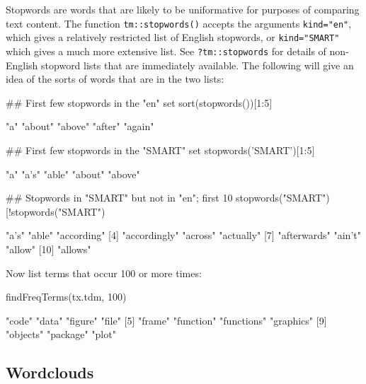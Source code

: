 \documentclass{tufte-book}\usepackage[]{graphicx}\usepackage[]{color}
\newcommand{\txtt}[1]{\texttt{#1}}
\begin{document}
Stopwords are words that are likely to be uniformative for purposes
of comparing text content.  The function \txtt{tm::stopwords()} 
accepts the arguments \txtt{kind="en"}, which gives a relatively
restricted list of English stopwords, or \txtt{kind="SMART"} which
gives a much more extensive list.  See \txtt{?tm::stopwords} for
details of non-English stopword lists that are immediately available.
The following will give an idea of the sorts of words that are in
the two lists:
\begin{Schunk}
\begin{Sinput}
## First few stopwords in the "en" set
sort(stopwords())[1:5]
\end{Sinput}
\begin{Soutput}
[1] "a"     "about" "above" "after" "again"
\end{Soutput}
\begin{Sinput}
## First few stopwords in the "SMART" set 
stopwords('SMART')[1:5]
\end{Sinput}
\begin{Soutput}
[1] "a"     "a's"   "able"  "about" "above"
\end{Soutput}
\begin{Sinput}
## Stopwords in "SMART" but not in "en"; first 10
stopwords("SMART")[!stopwords("SMART")%
\end{Sinput}
\begin{Soutput}
 [1] "a's"         "able"        "according"  
 [4] "accordingly" "across"      "actually"   
 [7] "afterwards"  "ain't"       "allow"      
[10] "allows"     
\end{Soutput}
\end{Schunk}

Now list terms that occur 100 or more times:
\begin{fullwidth}
\begin{Schunk}
\begin{Sinput}
findFreqTerms(tx.tdm, 100)
\end{Sinput}
\begin{Soutput}
 [1] "code"      "data"      "figure"    "file"     
 [5] "frame"     "function"  "functions" "graphics" 
 [9] "objects"   "package"   "plot"     
\end{Soutput}
\end{Schunk}
\end{fullwidth}

\subsection*{Wordclouds}
\end{document}
